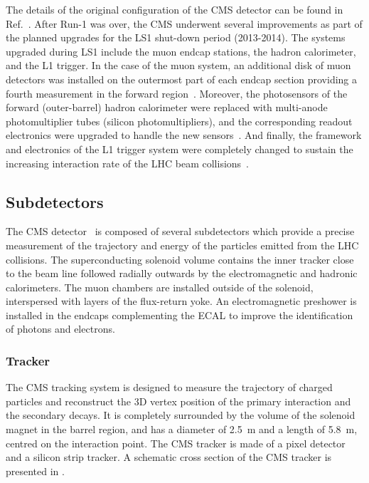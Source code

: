 The details of the original configuration of the CMS detector can be found in Ref.~\cite{CMS}. After Run-1 was over, the CMS underwent several improvements as part of the planned upgrades for the LS1 shut-down period (2013-2014). The systems upgraded during LS1 include the muon endcap stations, the hadron calorimeter, and the L1 trigger. In the case of the muon system, an additional disk of muon detectors was installed on the outermost part of each endcap section providing a fourth measurement in the forward region~\cite{CMSMuonUpgrade}. Moreover, the photosensors of the forward (outer-barrel) hadron calorimeter were replaced with multi-anode photomultiplier tubes (silicon photomultipliers), and the corresponding readout electronics were upgraded to handle the new sensors~\cite{CMSHCALUpgrade}. And finally, the framework and electronics of the L1 trigger system were completely changed to sustain the increasing interaction rate of the LHC beam collisions~\cite{L1_Stage2}.


\subsection{Subdetectors}\label{sec:Experiment_CMS_Subdetectors}

The CMS detector~\cite{CMS} is composed of several subdetectors which provide a precise measurement of the trajectory and energy of the particles emitted from the LHC collisions. The superconducting solenoid volume contains the inner tracker close to the beam line followed radially outwards by the electromagnetic and hadronic calorimeters. The muon chambers are installed outside of the solenoid, interspersed with layers of the flux-return yoke. An electromagnetic preshower is installed in the endcaps complementing the ECAL to improve the identification of photons and electrons.


\subsubsection{Tracker}\label{sec:Experiment_CMS_Subdetectors_Tracker}

The CMS tracking system is designed to measure the trajectory of charged particles and reconstruct the 3D vertex position of the primary interaction and the secondary decays. It is completely surrounded by the volume of the solenoid magnet in the barrel region, and has a diameter of \SI{2.5}{\m} and a length of \SI{5.8}{\m}, centred on the interaction point. The CMS tracker is made of a pixel detector and a silicon strip tracker. A schematic cross section of the CMS tracker is presented in .

